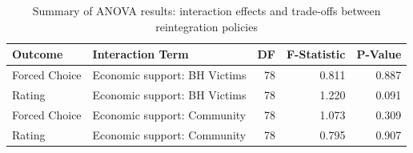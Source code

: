 \begin{table}[ht]
\centering
\begin{tabular}{llrrr}
  \hline
Outcome & Interaction Term & DF & F-Statistic & P-Value \\ 
  \hline
Forced Choice & Economic support: BH Victims & 78 & 0.811 & 0.887 \\ 
  Rating & Economic support: BH Victims & 78 & 1.220 & 0.091 \\ 
  Forced Choice & Economic support: Community & 78 & 1.073 & 0.309 \\ 
  Rating & Economic support: Community & 78 & 0.795 & 0.907 \\ 
   \hline
\end{tabular}
\caption{Summary of ANOVA results: interaction effects and trade-offs between reintegration policies} 
\label{tab:int_anova}
\end{table}
